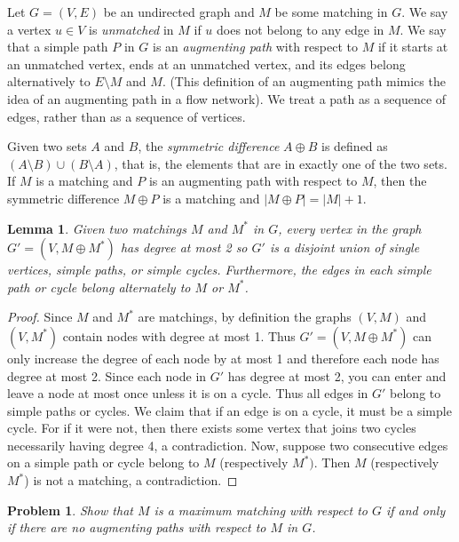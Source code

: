 \documentclass[11pt]{article}
\newtheorem{lemma}[theorem]{Lemma}
\newtheorem{problem}{Problem}
\begin{document}
Let $G=(V,E)$ be an undirected graph and $M$ be some matching in $G$.  We say a vertex $u \in V$ is {\em unmatched} in $M$ if $u$ does not belong to any edge in $M$.  We say that a simple path $P$ in $G$ is an {\em augmenting path} with respect to $M$ if it starts at an unmatched vertex, ends at an unmatched vertex, and its edges belong alternatively to $E \setminus M$ and $M$.  (This definition of an augmenting path mimics the idea of an augmenting path in a flow network).  We treat a path as a sequence of edges, rather than as a sequence of vertices.  

Given two sets $A$ and $B$, the {\em symmetric difference} $A \oplus B$ is defined as $(A \setminus B) \cup (B \setminus A)$, that is, the elements that are in exactly one of the two sets.  If $M$ is a matching and $P$ is an augmenting path with respect to $M$, then the symmetric difference $M \oplus P$ is a matching and $| M \oplus P | = |M| +1$.

\begin{lemma}
Given two matchings $M$ and $M^{*}$ in $G$, every vertex in the graph $G'=(V, M \oplus M^{*})$ has degree at most 2 so $G'$ is a disjoint union of single vertices, simple paths, or simple cycles.  Furthermore, the edges in each simple path or cycle belong alternately to $M$ or $M^{*}$.
\end{lemma}

\begin{proof}
Since $M$ and $M^{*}$ are matchings, by definition the graphs $(V,M)$ and $(V,M^{*})$ contain nodes with degree at most 1.  Thus $G'=(V, M \oplus M^{*})$ can only increase the degree of each node by at most 1 and therefore each node has degree at most 2.  Since each node in $G'$ has degree at most 2, you can enter and leave a node at most once unless it is on a cycle.  Thus all edges in $G'$ belong to simple paths or cycles.  We claim that if an edge is on a cycle, it must be a simple cycle.  For if it were not, then there exists some vertex that joins two cycles necessarily having degree 4, a contradiction.  Now, suppose two consecutive edges on a simple path or cycle belong to $M$ (respectively $M^{*})$.  Then $M$ (respectively $M^{*}$) is not a matching, a contradiction.
\end{proof}

\begin{problem} \label{problem:no-aug}
Show that $M$ is a maximum matching with respect to $G$ if and only if there are no augmenting paths with respect to $M$ in $G$.
\end{problem}
\end{document}
